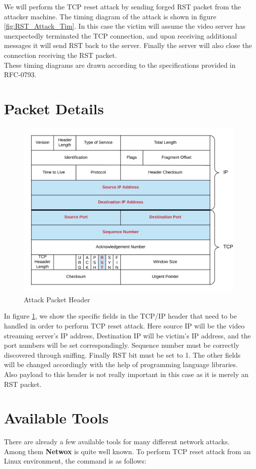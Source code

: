 \documentclass[14pt]{extarticle}
\begin{document}
    We will perform the TCP reset attack by sending forged RST packet from the attacker machine. The timing diagram of the attack is shown in figure \ref{fig:RST_Attack_Tim}. In this case the victim will assume the video server has unexpectedly terminated the TCP connection, and upon receiving additional messages it will send RST back to the server. Finally the server will also close the connection receiving the RST packet. \\ 
    These timing diagrams are drawn according to the specifications provided in RFC-0793.
    
\section{Packet Details}
    \begin{figure}
    	\centering
    	\includegraphics[width=.85\textwidth]{Pictures/TCP_IP_Packet.png}
    	\caption{Attack Packet Header} 
    	\label{fig:Attack_Packet}
    \end{figure}

    In figure \ref{fig:Attack_Packet}, we show the specific fields in the TCP/IP header that need to be handled in order to perform TCP reset attack. Here source IP will be the video streaming server's IP address, Destination IP will be victim's IP address, and the port numbers will be set correspondingly. Sequence number must be correctly discovered through sniffing. Finally RST bit must be set to 1. The other fields will be changed accordingly with the help of programming language libraries. Also payload to this header is not really important in this case as it is merely an RST packet.

\section{Available Tools}
    There are already a few available tools for many different network attacks. Among them \textbf{Netwox} is quite well known. To perform TCP reset attack from an Linux environment, the command is as follows:
    
\end{document}
